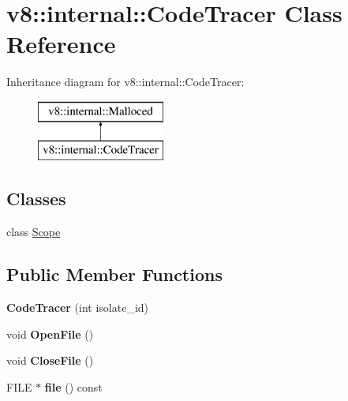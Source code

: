 \hypertarget{classv8_1_1internal_1_1_code_tracer}{}\section{v8\+:\+:internal\+:\+:Code\+Tracer Class Reference}
\label{classv8_1_1internal_1_1_code_tracer}
Inheritance diagram for v8\+:\+:internal\+:\+:Code\+Tracer\+:\begin{figure}[H]
\begin{center}
\leavevmode
\includegraphics[height=2.000000cm]{classv8_1_1internal_1_1_code_tracer}
\end{center}
\end{figure}
\subsection*{Classes}
\begin{DoxyCompactItemize}
\item 
class \hyperlink{classv8_1_1internal_1_1_code_tracer_1_1_scope}{Scope}
\end{DoxyCompactItemize}
\subsection*{Public Member Functions}
\begin{DoxyCompactItemize}
\item 
{\bfseries Code\+Tracer} (int isolate\+\_\+id)\hypertarget{classv8_1_1internal_1_1_code_tracer_a01c6fd042c2f2bec8d012c7c4137e2d1}{}\label{classv8_1_1internal_1_1_code_tracer_a01c6fd042c2f2bec8d012c7c4137e2d1}

\item 
void {\bfseries Open\+File} ()\hypertarget{classv8_1_1internal_1_1_code_tracer_a844b34f3cc4aff36a60c699bf1df2945}{}\label{classv8_1_1internal_1_1_code_tracer_a844b34f3cc4aff36a60c699bf1df2945}

\item 
void {\bfseries Close\+File} ()\hypertarget{classv8_1_1internal_1_1_code_tracer_ae34b0a83ca366d5939413b1ee34529b8}{}\label{classv8_1_1internal_1_1_code_tracer_ae34b0a83ca366d5939413b1ee34529b8}

\item 
F\+I\+LE $\ast$ {\bfseries file} () const \hypertarget{classv8_1_1internal_1_1_code_tracer_aed9249eed02b78e620db3faf8341c1ea}{}\label{classv8_1_1internal_1_1_code_tracer_aed9249eed02b78e620db3faf8341c1ea}

\end{DoxyCompactItemize}

